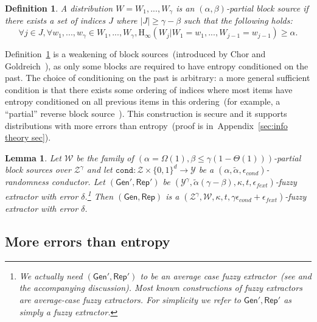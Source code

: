 \documentclass[11pt]{article}
\newcommand{\apref}[1]{\mbox{Appendix~\ref{#1}}}
\newcommand{\defref}[1]{\mbox{Definition~\ref{#1}}}
\newcommand{\class}[1]{{\ensuremath{\mathsf{#1}}}}
\newcommand{\gen}{\ensuremath{\class{Gen}}\xspace}
\newcommand{\rep}{\ensuremath{\class{Rep}}\xspace}
\newcommand{\zo}{\ensuremath{\{0, 1\}}}
\newcommand{\Hoo}{\mathrm{H}_\infty}
\newcommand{\cond}{\ensuremath{\mathtt{cond}}}
\newtheorem{lemma}[theorem]{Lemma}
\newtheorem{definition}[theorem]{Definition}
\begin{document}
\begin{definition}
\label{def:partial source}
A distribution $W = W_1,..., W_\gamma$ is an $(\alpha, \beta)$-partial block source if there exists a set of indices $J$ where $|J| \geq \gamma - \beta$ such that the following holds:
\[
\forall j\in J, \forall w_1,..., w_\gamma \in W_1,..., W_\gamma, \Hoo(W_j | W_1 = w_1,..., W_{j-1}=w_{j-1}) \geq \alpha.
\]
\end{definition}
\defref{def:partial source} is a weakening of block sources~(introduced by Chor and Goldreich~\cite{DBLP:journals/siamcomp/ChorG88}), as only some blocks are required to have entropy conditioned on the past.  The choice of conditioning on the past is arbitrary: a more general sufficient condition is that there exists some ordering of indices where most items have entropy conditioned on all previous items in this ordering~(for example, a ``partial'' reverse block source~\cite{vadhan2003constructing}).  This construction is secure and it supports distributions with more errors than entropy~(proof is in~\apref{sec:info theory sec}).

\begin{lemma}
\label{lem:info theory sec}
Let $\mathcal{W}$ be the family of $(\alpha = \Omega(1), \beta\leq \gamma(1-\Theta(1)))$-partial block sources over $\mathcal{Z}^\gamma$ and let $\cond: \mathcal{Z} \times \zo^d\rightarrow \mathcal{Y}$ be a $(\alpha, \tilde{\alpha}, \epsilon_{cond})$-randomness conductor.  Let $(\gen', \rep')$ be $(\mathcal{Y}^\gamma, \tilde{\alpha}(\gamma - \beta), \kappa, t, \epsilon_{fext})$-fuzzy extractor with error $\delta$.\footnote{We actually need $(\gen', \rep')$ to be an average case fuzzy extractor~(see \cite[Definition 4]{DBLP:journals/siamcomp/DodisORS08} and the accompanying discussion).  Most known constructions of fuzzy extractors are average-case fuzzy extractors.  For simplicity we refer to $\gen', \rep'$ as simply a fuzzy extractor.}  Then $(\gen, \rep)$ is a $(\mathcal{Z}^\gamma, \mathcal{W}, \kappa, t, \gamma\epsilon_{cond}+\epsilon_{fext})$-fuzzy extractor with error $\delta$.

\end{lemma}

\subsection{More errors than entropy}
\end{document}
